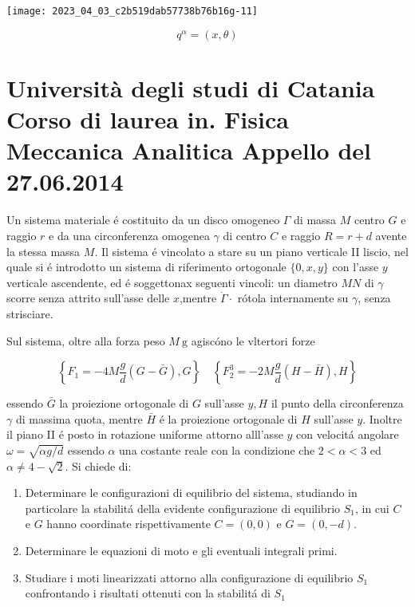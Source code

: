 \documentclass[10pt]{article}
\begin{document}
\begin{center}
\texttt{[image: 2023\_04\_03\_c2b519dab57738b76b16g-11]}
\end{center}

\[
q^{\alpha}=(x, \theta)
\]

\section{Università degli studi di Catania
Corso di laurea in. Fisica
Meccanica Analitica
Appello del 27.06.2014}
Un sistema materiale é costituito da un disco omogeneo \(\Gamma\) di massa \(M\) centro \(G\) e raggio \(r\) e da una circonferenza omogenea \(\gamma\) di centro \(C\) e raggio \(R=r+d\) avente la stessa massa \(M\). Il sistema é vincolato a stare su un piano verticale II liscio, nel quale si é introdotto un sistema di riferimento ortogonale \(\{0, x, y\}\) con l'asse \(y\) verticale ascendente, ed é soggettonax seguenti vincoli: un diametro \(M N\) di \(\gamma\) scorre senza attrito sull'asse delle \(x\),mentre \(\dot{\Gamma} \cdot\) rótola internamente su \(\gamma\), senza strisciare.

Sul sistema, oltre alla forza peso \(M \mathrm{~g}\) agiscóno le vltertori forze

\[
\left\{F_{1}=-4 M \frac{g}{d}(G-\bar{G}), G\right\} \quad\left\{F_{2}^{3}=-2 M \frac{g}{d}(H-\bar{H}), H\right\}
\]

essendo \(\bar{G}\) la proiezione ortogonale di \(G\) sull'asse \(y, H\) il punto della circonferenza \(\gamma\) di massima quota, mentre \(\bar{H}\) é la proiezione ortogonale di \(H\) sull'asse \(y\). Inoltre il piano II é posto in rotazione uniforme attorno alll'asse \(y\) con velocitá angolare \(\omega=\sqrt{\alpha g / d}\) essendo \(\alpha\) una costante reale con la condizione che \(2<\alpha<3\) ed \(\alpha \neq 4-\sqrt{2}\). Si chiede di:

\begin{enumerate}
  \item Determinare le configurazioni di equilibrio del sistema, studiando in particolare la stabilitá della evidente configurazione di equilibrio \(S_{1}\), in cui \(C\) e \(G\) hanno coordinate rispettivamente \(C=(0,0)\) e \(G=(0,-d)\).

  \item Determinare le equazioni di moto e gli eventuali integrali primi.

  \item Studiare i moti linearizzati attorno alla configurazione di equilibrio \(S_{1}\) confrontando i risultati ottenuti con la stabilitá di \(S_{1}\)

\end{enumerate}
\end{document}
